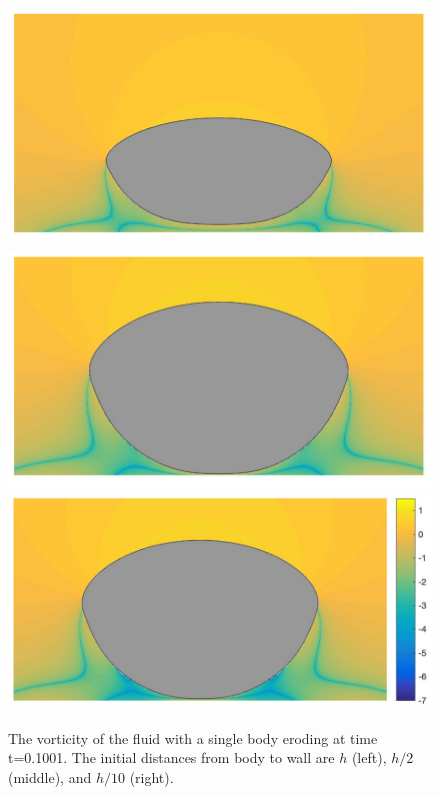 \documentclass[preprint, 10pt]{elsarticle}
\begin{document}
\begin{figure}[H]
\begin{center}
\includegraphics[width = 0.30 \textwidth]{./figs/1b_0d4r1h_vort}
\includegraphics[width = 0.30 \textwidth]{./figs/1b_0d4r0d5h_vort}
\includegraphics[width = 0.33 \textwidth]{./figs/1b_0d4r0d1h_vort}
\caption{\label{fig:NearWall_vort} The vorticity of the fluid with a single body eroding 
at time t=0.1001. The initial distances from body to wall are $h$ (left), $h/2$
  (middle), and $h/10$ (right).  }
\end{center}
\end{figure}


\end{document}
